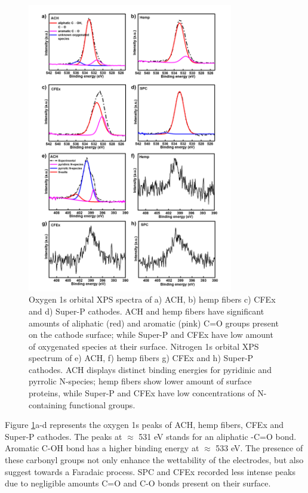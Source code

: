 \begin{figure}[tbh!]
  \centering
  \includegraphics[width=0.8\textwidth]{Figures/chap5fig/xpson}
    \caption{Oxygen 1s orbital XPS spectra of a) ACH, b) hemp fibers c) CFEx and d) Super-P cathodes. ACH and hemp fibers have significant amounts of aliphatic (red) and aromatic (pink) C=O groups present on the cathode surface; while Super-P and CFEx have low amount of oxygenated species at their surface. Nitrogen 1s orbital XPS spectrum of e) ACH, f) hemp fibers g) CFEx and h) Super-P cathodes. ACH displays distinct binding energies for pyridinic and pyrrolic N-species; hemp fibers show lower amount of surface proteins, while Super-P and CFEx have low concentrations of N-containing functional groups.}
  \label{Figures/chap5fig:xpson}
\end{figure}
Figure \ref{Figures/chap5fig:xpson}a-d represents the oxygen 1s peaks of ACH, hemp fibers, CFEx and Super-P cathodes. The peaks at $\approx$ 531 eV stands for an aliphatic -C=O bond. Aromatic C-OH bond has a higher binding energy at $\approx$ 533 eV. The presence of these carbonyl groups not only enhance the wettability of the electrodes, but also suggest towards a Faradaic process\cite{}. 
SPC and CFEx recorded less intense peaks due to negligible amounts C=O and C-O bonds present on their surface.
